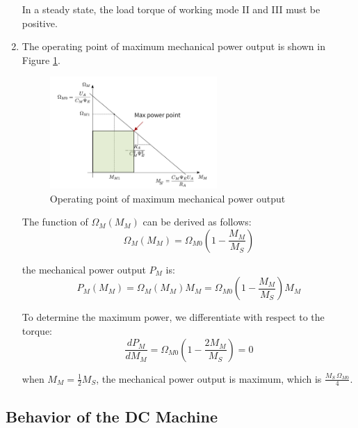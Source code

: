 \documentclass[12pt,a4paper, openany]{book}
\begin{document}
\begin{enumerate}
In a steady state, the load torque of working mode II and III must be positive. 
\item {\bf *} 
The operating point of maximum mechanical power output is shown in Figure \ref{fig:Operating point of maximum mechanical power output}.
\begin{figure}[H]
    \centering
    \includegraphics[width=0.6\textwidth]{figures/Operating point of maximum mechanical power output.png}
    \caption{Operating point of maximum mechanical power output}
    \label{fig:Operating point of maximum mechanical power output}
\end{figure}

The function of $ \Omega_M(M_M)$ can be derived as follows:
\begin{equation}
    \Omega_M(M_M) = \Omega_{M0}\left(1 - \frac{M_M}{M_S}\right)
\end{equation}
    
the mechanical power output $P_M$ is:
\begin{equation}
    P_M(M_M) = \Omega_M(M_M) M_M = \Omega_{M0}\left(1 - \frac{M_M}{M_S}\right) M_M
\end{equation}

To determine the maximum power, we differentiate with respect to the torque:
\begin{equation}
    \frac{dP_M}{dM_M} = \Omega_{M0}\left(1 - \frac{2M_M}{M_S}\right) = 0
\end{equation}

when $M_M = \frac{1}{2} M_S$, the mechanical power output is maximum, which is $\frac{M_S \, \Omega_{M0}}{4}$.
\end{enumerate}


\subsection{Behavior of the DC Machine}
\end{document}
